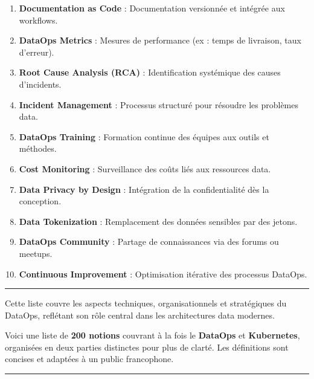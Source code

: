 \documentclass[
  letterpaper,
  DIV=11,
  numbers=noendperiod]{scrartcl}
\providecommand{\tightlist}{%
  \setlength{\itemsep}{0pt}\setlength{\parskip}{0pt}}\usepackage{longtable,booktabs,array}
\begin{document}
\begin{enumerate}
\def\labelenumi{\arabic{enumi}.}
\setcounter{enumi}{90}
\tightlist
\item
  \textbf{Documentation as Code} : Documentation versionnée et intégrée
  aux workflows.\\
\item
  \textbf{DataOps Metrics} : Mesures de performance (ex : temps de
  livraison, taux d'erreur).\\
\item
  \textbf{Root Cause Analysis (RCA)} : Identification systémique des
  causes d'incidents.\\
\item
  \textbf{Incident Management} : Processus structuré pour résoudre les
  problèmes data.\\
\item
  \textbf{DataOps Training} : Formation continue des équipes aux outils
  et méthodes.\\
\item
  \textbf{Cost Monitoring} : Surveillance des coûts liés aux ressources
  data.\\
\item
  \textbf{Data Privacy by Design} : Intégration de la confidentialité
  dès la conception.\\
\item
  \textbf{Data Tokenization} : Remplacement des données sensibles par
  des jetons.\\
\item
  \textbf{DataOps Community} : Partage de connaissances via des forums
  ou meetups.\\
\item
  \textbf{Continuous Improvement} : Optimisation itérative des processus
  DataOps.
\end{enumerate}

\begin{center}\rule{0.5\linewidth}{0.5pt}\end{center}

Cette liste couvre les aspects techniques, organisationnels et
stratégiques du DataOps, reflétant son rôle central dans les
architectures data modernes.

Voici une liste de \textbf{200 notions} couvrant à la fois le
\textbf{DataOps} et \textbf{Kubernetes}, organisées en deux parties
distinctes pour plus de clarté. Les définitions sont concises et
adaptées à un public francophone.

\begin{center}\rule{0.5\linewidth}{0.5pt}\end{center}
\end{document}
